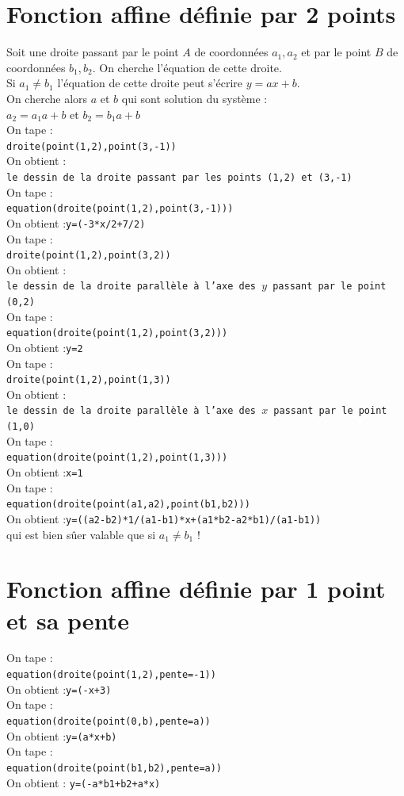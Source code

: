 \documentclass[a4paper,11pt]{book}
\begin{document}
\section{Fonction affine d\'efinie par 2 points}
Soit une droite passant par le point $A$ de coordonn\'ees $a_1,a_2$ et par le 
point $B$ de coordonn\'ees $b_1,b_2$. On cherche l'\'equation de cette droite.\\
Si $a_1\neq b_1$ l'\'equation de cette droite peut s'\'ecrire $y=ax+b$.\\
On cherche alors $a$ et $b$ qui sont solution du syst\`eme :\\
$a_2=a_1a+b$ et $b_2=b_1a+b$ \\
On tape :\\
{\tt droite(point(1,2),point(3,-1))}\\
On obtient :\\
{\tt le dessin de la droite passant par les points (1,2) et (3,-1)}\\
On tape :\\
{\tt equation(droite(point(1,2),point(3,-1)))}\\
On obtient :{\tt y=(-3*x/2+7/2)}\\
On tape :\\
{\tt droite(point(1,2),point(3,2))}\\
On obtient :\\
{\tt le dessin de la droite parall\`ele \`a l'axe des $y$ passant par le point  (0,2)}\\
On tape :\\
{\tt equation(droite(point(1,2),point(3,2)))}\\
On obtient :{\tt y=2}\\
On tape :\\
{\tt droite(point(1,2),point(1,3))}\\
On obtient :\\
{\tt le dessin de la droite parall\`ele \`a l'axe des $x$ passant par le point  (1,0)}\\
On tape :\\
{\tt equation(droite(point(1,2),point(1,3)))}\\
On obtient :{\tt x=1}\\
On tape :\\
{\tt equation(droite(point(a1,a2),point(b1,b2)))}\\
On obtient :{\tt y=((a2-b2)*1/(a1-b1)*x+(a1*b2-a2*b1)/(a1-b1))}\\
qui est bien s\^uer valable que si $a_1\neq b_1$ !
\section{Fonction affine d\'efinie par 1 point et sa pente}
On tape :\\
{\tt equation(droite(point(1,2),pente=-1))}\\
On obtient :{\tt y=(-x+3)}\\
On tape :\\
{\tt equation(droite(point(0,b),pente=a))}\\
On obtient :{\tt y=(a*x+b)}\\
On tape :\\
{\tt equation(droite(point(b1,b2),pente=a))}\\
On obtient : {\tt y=(-a*b1+b2+a*x)}
\end{document}
